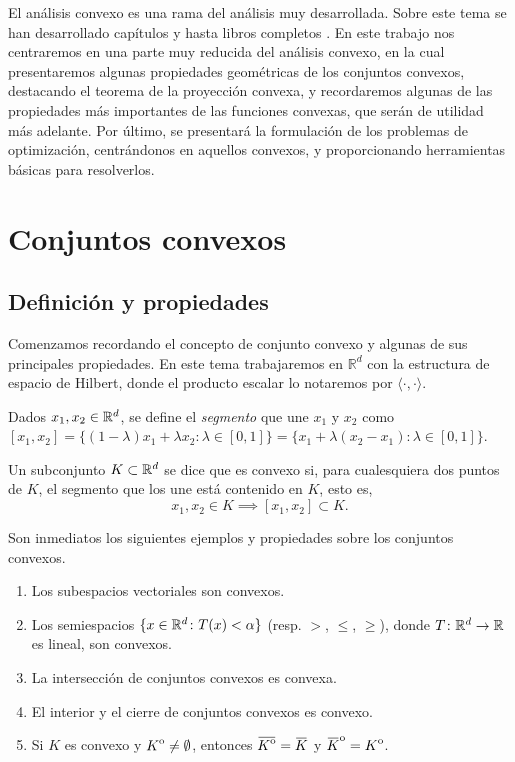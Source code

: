 \documentclass{book}
\begin{document}
El análisis convexo es una rama del análisis muy desarrollada. Sobre este tema se han desarrollado capítulos y hasta libros completos \cite{convexoptimization,convexanalysis,variations_convex}. En este trabajo nos centraremos en una parte muy reducida del análisis convexo, en la cual presentaremos algunas propiedades geométricas de los conjuntos convexos, destacando el teorema de la proyección convexa, y recordaremos algunas de las propiedades más importantes de las funciones convexas, que serán de utilidad más adelante. Por último, se presentará la formulación de los problemas de optimización, centrándonos en aquellos convexos, y proporcionando herramientas básicas para resolverlos.

\section{Conjuntos convexos}

\subsection{Definición y propiedades}

Comenzamos recordando el concepto de conjunto convexo y algunas de sus principales propiedades. En este tema trabajaremos en $\mathbb{R}^d$ con la estructura de espacio de Hilbert, donde el producto escalar lo notaremos por $\langle \cdot, \cdot \rangle$.

\begin{definition}
	Dados $x_1,x_2 \in \mathbb{R}^d$, se define el \emph{segmento} que une $x_1$ y $x_2$ como $[x_1,x_2] = \{ (1-\lambda) x_1 + \lambda x_2 \colon \lambda \in [0,1] \} = \{x_1 + \lambda(x_2-x_1) \colon \lambda \in [0,1] \}$.
\end{definition}

\begin{definition}
	Un subconjunto $K \subset \mathbb{R}^d$ se dice que es convexo si, para cualesquiera dos puntos de $K$, el segmento que los une está contenido en $K$, esto es,
	\[ x_1,x_2 \in K \implies [x_1,x_2] \subset K. \]
\end{definition}

Son inmediatos los siguientes ejemplos y propiedades sobre los conjuntos convexos.

\begin{enumerate}
\item Los subespacios vectoriales son convexos.
\item Los semiespacios $\{x \in \mathbb{R}^d \colon T(x) < \alpha \}$ (resp. $>$, $\le$, $\ge$), donde $T \colon \mathbb{R}^d \to \mathbb{R}$ es lineal, son convexos.
\item La intersección de conjuntos convexos es convexa.
\item El interior y el cierre de conjuntos convexos es convexo.
\item Si $K$ es convexo y ${\kern0ptK}^{\mathrm{o}} \ne \emptyset$, entonces $\closure{\interior{K}} = \closure{K}$ y $\interior{\closure{K}} = \interior{K}$. 

\end{enumerate}
\end{document}
